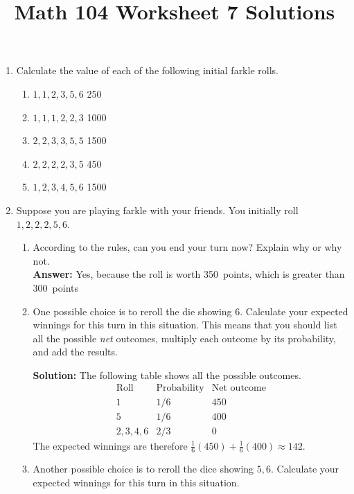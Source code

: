 \documentclass[12pt]{article}
\author{}
\title{Math 104 Worksheet 7 Solutions}
\begin{document}
\maketitle
\thispagestyle{empty}
\begin{enumerate}
\item Calculate the value of each of the following
initial farkle rolls.
\begin{enumerate}
\item $1,1,2,3,5,6$
 250
\item $1,1,1,2,2,3$
 1000
\item $2,2,3,3,5,5$
 1500
\item $2,2,2,2,3,5$
 450
\item $1,2,3,4,5,6$
 1500
\end{enumerate}

\item Suppose you are playing farkle with your
friends. You initially roll $1,2,2,2,5,6$.
\begin{enumerate}
\item\label{Stay}
According to the rules, can you end your turn now?
Explain why or why not.\\
{\bf Answer:} Yes, because the roll is worth 350~points,
which is greater than 300~points
\item One possible choice is to reroll the die showing 6.
Calculate your expected winnings for this turn in
this situation.
This means that you should list all the possible {\em net}
outcomes, multiply each outcome by its probability,
and add the results.

{\bf Solution:} The following table shows
all the possible outcomes.
\[\begin{array}{ccc}
\text{Roll}&\text{Probability}&\text{Net outcome}\\\hline
1&1/6&450\\
5&1/6&400\\
2,3,4,6&2/3&0
\end{array}\]
The expected winnings are therefore
$\frac{1}{6}\left(450\right)+\frac{1}{6}\left(400\right)
\approx 142$.

\item\label{RollTwo} Another possible choice is to reroll
the dice showing $5,6$.
Calculate your expected winnings for this turn in
this situation.


\end{enumerate}
\end{enumerate}
\end{document}
